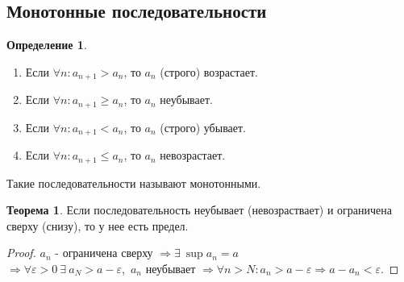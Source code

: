 \documentclass[a4paper, 12pt]{article}
\renewcommand{\epsilon}{\varepsilon}
\newcommand\tab[1][.5cm]{\hspace*{#1}}
\theoremstyle{definition}
\newtheorem*{definition}{Определение}
\newtheorem*{theorem}{Теорема}
\begin{document}
        \subsection{Монотонные последовательности}
        \begin{definition} \tab
            \begin{enumerate}
                \item Если $\forall n: a_{n+1}>a_n$, то $a_n$ (строго) возрастает.
                \item Если $\forall n: a_{n+1}\geq a_n$, то $a_n$ неубывает.
                \item Если $\forall n: a_{n+1}<a_n$, то $a_n$ (строго) убывает.
                \item Если $\forall n: a_{n+1}\leq a_n$, то $a_n$ невозрастает.
            \end{enumerate}
            Такие последовательности называют монотонными.
        \end{definition} 
        \begin{theorem}
            Если последовательность неубывает (невозраствает) и ограничена сверху (снизу), то у нее есть предел.
        \end{theorem}
        \begin{proof}
            $a_n$ - ограничена сверху $\Rightarrow \exists\ \sup a_n=a$\\ $\Rightarrow \forall \epsilon>0\ \exists\ a_N>a-\epsilon$,\ $a_n$ неубывает $\Rightarrow \forall n>N: a_n>a-\epsilon \Rightarrow a-a_n<\epsilon$.
        \end{proof}  
\end{document}
